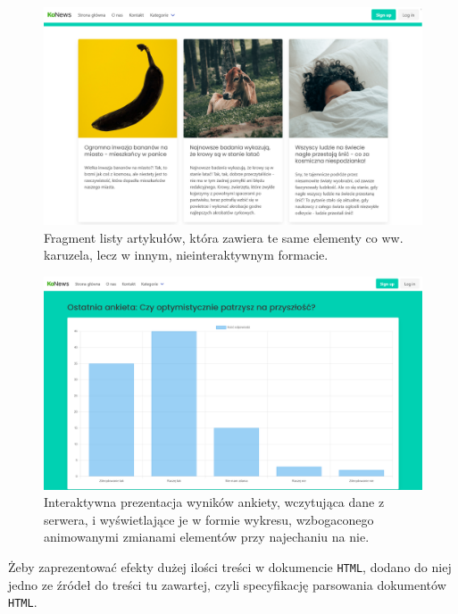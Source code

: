 \documentclass[licencjacka]{pracadypl}
\begin{document}
\begin{figure}[H]
  \includegraphics[width=\linewidth]{images/frontpage-articles.png}
  \caption{Fragment listy artykułów, która zawiera te same elementy co ww. karuzela, lecz w innym, nieinteraktywnym formacie.}
  \label{fig:frontpage-articles}
\end{figure}

\begin{figure}[H]
  \includegraphics[width=\linewidth]{images/frontpage-dynamic-article.png}
  \caption{Interaktywna prezentacja wyników ankiety, wczytująca dane z serwera, i wyświetlające je w formie wykresu, wzbogaconego animowanymi zmianami elementów przy najechaniu na nie.}
  \label{fig:frontpage-dynamic}
\end{figure}

Żeby zaprezentować efekty dużej ilości treści w dokumencie \texttt{HTML}, dodano do niej jedno ze źródeł do treści tu zawartej, czyli specyfikację parsowania dokumentów \texttt{HTML}.
\end{document}
